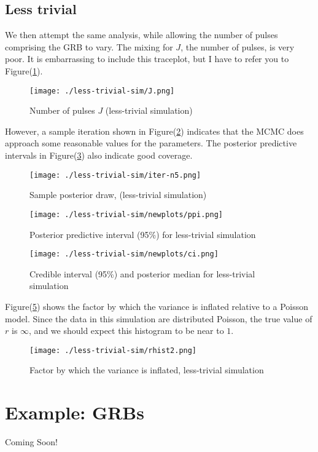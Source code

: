 \documentclass[iop,onecolumn]{emulateapj}
\newcommand{\Fig}[1]{Figure\thinspace(\ref{#1})}
\begin{document}

\subsection{Less trivial}
We then attempt the same analysis, while allowing the number of pulses comprising the GRB to vary.  The mixing for $J$, the number of pulses, is very poor. It is embarrassing to include this traceplot, but I have to refer you to \Fig{f:ltriv-J}. 

\begin{figure}
 \centering
\texttt{[image: ./less-trivial-sim/J.png]}
\caption{Number of pulses $J$ (less-trivial simulation)}
 \label{f:ltriv-J}
\end{figure}

However, a sample iteration shown in \Fig{f:ltriv-iter} indicates that the MCMC does approach some reasonable values for the parameters. The posterior predictive intervals in \Fig{f:ltriv-ppi} also indicate good coverage.


\begin{figure}
 \centering
\texttt{[image: ./less-trivial-sim/iter-n5.png]}
\caption{Sample posterior draw,  (less-trivial simulation)}
 \label{f:ltriv-iter}
\end{figure}


\begin{figure}
 \centering
\texttt{[image: ./less-trivial-sim/newplots/ppi.png]}
\caption{Posterior predictive interval (95\%) for less-trivial simulation}
 \label{f:ltriv-ppi}
\end{figure}

\begin{figure}
 \centering
\texttt{[image: ./less-trivial-sim/newplots/ci.png]}
\caption{Credible interval (95\%) and posterior median for less-trivial simulation}
 \label{f:ltriv-ci}
\end{figure}


\Fig{f:ltriv-r} shows the factor by which the variance is inflated relative to a Poisson model.  Since the data in this simulation are distributed Poisson, the true value of $r$ is $\infty$, and we should expect this histogram to be near to $1$. 

\begin{figure}
 \centering
\texttt{[image: ./less-trivial-sim/rhist2.png]}
\caption{Factor by which the variance is inflated, less-trivial simulation}
 \label{f:ltriv-r}
\end{figure}

\section{Example: GRBs}
Coming Soon!

\normalbaselines %

\end{document}
